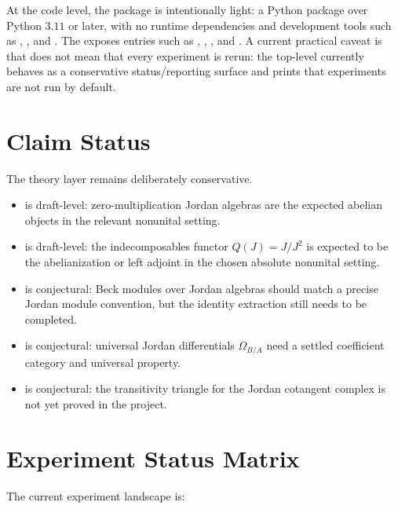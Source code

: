 \documentclass[11pt]{report}
\theoremstyle{definition}
\theoremstyle{plain}
\begin{document}
At the code level, the package is intentionally light: a Python package over
Python \(3.11\) or later, with no runtime dependencies and development tools
such as , , and . The 
exposes entries such as , , , and
. A current practical caveat is that 
does not mean that every experiment is rerun: the top-level
 currently behaves as a conservative
status/reporting surface and prints that experiments are not run by default.

\section{Claim Status}

The theory layer remains deliberately conservative.

\begin{itemize}[leftmargin=*]
  \item {} is draft-level: zero-multiplication Jordan algebras
  are the expected abelian objects in the relevant nonunital setting.
  \item {} is draft-level: the indecomposables functor
  \(Q(J)=J/J^2\) is expected to be the abelianization or left adjoint in the
  chosen absolute nonunital setting.
  \item {} is conjectural: Beck modules over Jordan algebras
  should match a precise Jordan module convention, but the identity extraction
  still needs to be completed.
  \item {} is conjectural: universal Jordan differentials
  \(\Omega_{B/A}\) need a settled coefficient category and universal property.
  \item {} is conjectural: the transitivity triangle for the
  Jordan cotangent complex is not yet proved in the project.
\end{itemize}

\section{Experiment Status Matrix}

The current experiment landscape is:
\end{document}
